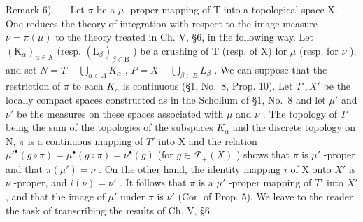 Remark 6). --- Let \(\pi\) be a \(\mu\) -proper mapping of T into a topological space X. One reduces the theory of integration with respect to the image measure \(\nu = \pi(\mu)\) to the theory treated in Ch. V, §6, in the following way. Let \((\mathrm{K}_{\alpha})_{\alpha \in \mathrm{A}}\) (resp. \((\mathrm{L}_{\beta})_{\beta \in \mathrm{B}}\) ) be a crushing of T (resp. of X) for \(\mu\) (resp. for \(\nu\) ), and set \(N = T - \bigcup_{\alpha \in A} K_{\alpha}\) , \(P = X - \bigcup_{\beta \in B} L_{\beta}\) . We can suppose that the restriction of \(\pi\) to each \(K_{\alpha}\) is continuous (§1, No.~8, Prop. 10). Let \(T', X'\) be the locally compact spaces constructed as in the Scholium of §1, No.~8 and let \(\mu'\) and \(\nu'\) be the measures on these spaces associated with \(\mu\) and \(\nu\) . The topology of \(T'\) being the sum of the topologies of the subspaces \(K_{\alpha}\) and the discrete topology on N, \(\pi\) is a continuous mapping of \(T'\) into X and the relation \(\mu'^{\bullet}(g \circ \pi) = \mu^{\bullet}(g \circ \pi) = \nu^{\bullet}(g)\) (for \(g \in \mathcal{F}_{+}(X)\) ) shows that \(\pi\) is \(\mu'\) -proper and that \(\pi(\mu') = \nu\) . On the other hand, the identity mapping \(i\) of X onto \(X'\) is \(\nu\) -proper, and \(i(\nu) = \nu'\) . It follows that \(\pi\) is a \(\mu'\) -proper mapping of \(T'\) into \(X'\) , and that the image of \(\mu'\) under \(\pi\) is \(\nu'\) (Cor. of Prop. 5). We leave to the reader the task of transcribing the results of Ch. V, §6.

